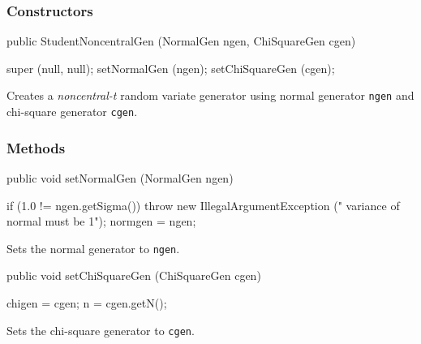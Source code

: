\subsubsection* {Constructors}
\begin{code}

   public StudentNoncentralGen (NormalGen ngen, ChiSquareGen cgen) \begin{hide} {
      super (null, null);
      setNormalGen (ngen);
      setChiSquareGen (cgen);
   }\end{hide}
\end{code}
\begin{tabb}  Creates a \emph{noncentral-t} random variate generator
 using normal generator \texttt{ngen} and chi-square generator \texttt{cgen}.
\end{tabb}


\subsubsection* {Methods}
\begin{code}

   public void setNormalGen (NormalGen ngen)\begin{hide} {
      if (1.0 != ngen.getSigma())
         throw new IllegalArgumentException ("   variance of normal must be 1");
      normgen = ngen;
   }\end{hide}
\end{code}
 \begin{tabb} Sets the normal generator to \texttt{ngen}.
 \end{tabb}
\begin{code}

   public void setChiSquareGen (ChiSquareGen cgen)\begin{hide} {
      chigen = cgen;
      n = cgen.getN();
   }\end{hide}
\end{code}
 \begin{tabb} Sets the chi-square generator to \texttt{cgen}.
 \end{tabb}
\begin{code}
\begin{hide}
}
\end{hide}
\end{code}

